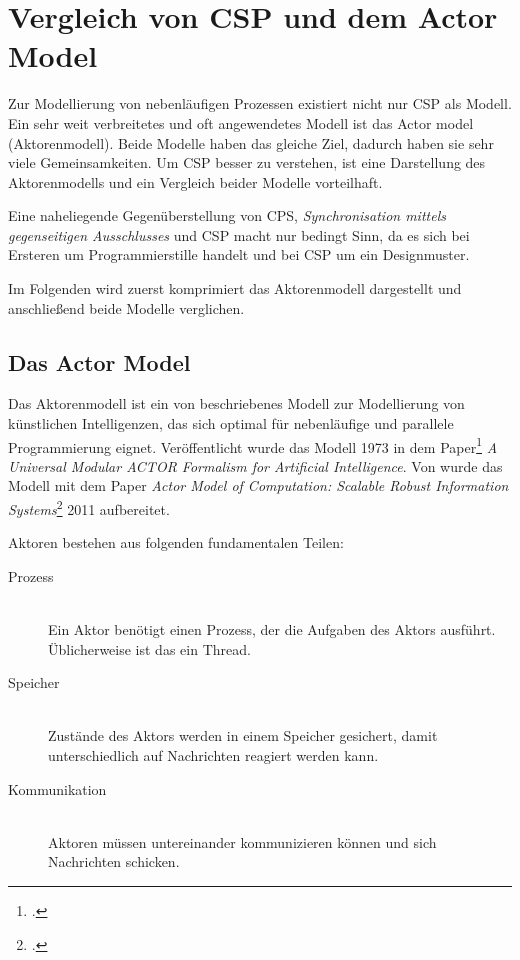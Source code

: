 \section{Vergleich von \acs{CSP} und dem Actor Model}

Zur Modellierung von nebenläufigen Prozessen existiert nicht nur \ac{CSP} als Modell. Ein sehr weit verbreitetes und oft angewendetes Modell ist das Actor model (Aktorenmodell). Beide Modelle haben das gleiche Ziel, dadurch haben sie sehr viele Gemeinsamkeiten. Um \ac{CSP} besser zu verstehen, ist eine Darstellung des Aktorenmodells und ein Vergleich beider Modelle vorteilhaft.

Eine naheliegende Gegenüberstellung von \ac{CPS}, \textit{Synchronisation mittels gegenseitigen Ausschlusses} und \ac{CSP} macht nur bedingt Sinn, da es sich bei Ersteren um Programmierstille handelt und bei \ac{CSP} um ein Designmuster.

Im Folgenden wird zuerst komprimiert das Aktorenmodell dargestellt und anschließend beide Modelle verglichen.

\subsection{Das Actor Model}
Das Aktorenmodell ist ein von \citeauthor{ACTORS} beschriebenes Modell zur Modellierung von künstlichen Intelligenzen, das sich optimal für nebenläufige und parallele Programmierung eignet. Veröffentlicht wurde das Modell 1973 in dem Paper\footcite{ACTORS} \textit{A Universal Modular ACTOR Formalism for Artificial Intelligence}. Von \citeauthor{ACTORSNEW} wurde das Modell mit dem Paper \textit{Actor Model of Computation: Scalable Robust Information Systems}\footcite{ACTORSNEW} 2011 aufbereitet. 

Aktoren bestehen aus folgenden fundamentalen Teilen:

\begin{description}
\item[Prozess]\hfill \\
Ein Aktor benötigt einen Prozess, der die Aufgaben des Aktors ausführt. Üblicherweise ist das ein Thread.
\item[Speicher]\hfill \\
Zustände des Aktors werden in einem Speicher gesichert, damit unterschiedlich auf Nachrichten reagiert werden kann.
\item[Kommunikation] \hfill \\
Aktoren müssen untereinander kommunizieren können und sich Nachrichten schicken.
\end{description}

